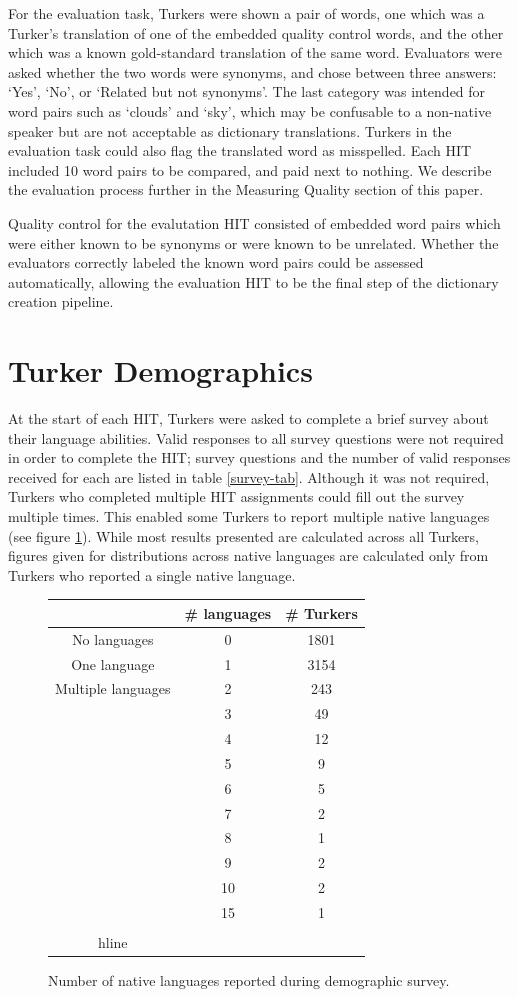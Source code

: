 \documentclass[11pt]{article}
\begin{document}
For the evaluation task, Turkers were shown a pair of words, one which was a Turker's translation of one of the embedded quality control words, and the other which was a known gold-standard translation of the same word. Evaluators were asked whether the two words were synonyms, and chose between three answers: `Yes', `No', or `Related but not synonyms'. The last category was intended for word pairs such as `clouds' and `sky', which may be confusable to a non-native speaker but are not acceptable as dictionary translations. Turkers in the evaluation task could also flag the translated word as misspelled. Each HIT included 10 word pairs to be compared, and paid next to nothing. We describe the evaluation process further in the Measuring Quality section of this paper.

Quality control for the evalutation HIT consisted of embedded word pairs which were either known to be synonyms or were known to be unrelated. Whether the evaluators correctly labeled the known word pairs could be assessed automatically, allowing the evaluation HIT to be the final step of the dictionary creation pipeline.


\section{Turker Demographics}
At the start of each HIT, Turkers were asked to complete a brief survey about their language abilities. Valid responses to all survey questions were not required in order to complete the HIT; survey questions and the number of valid responses received for each are listed in table \ref{survey-tab}. Although it was not required, Turkers who completed multiple HIT assignments could fill out the survey multiple times. This enabled some Turkers to report multiple native languages (see figure \ref{numlangs-tab}). While most results presented are calculated across all Turkers, figures given for distributions across native languages are calculated only from Turkers who reported a single native language.\\

\begin{figure}[h]
\begin{tabular}{ccc}\hline\hline
&\# languages&\# Turkers\\ \hline
No languages&0&1801\\
One language&1&3154\\
Multiple languages&2&243	\\
&3&49\\
&4&12\\
&5&9\\
&6&5\\
&7&2\\
&8&1\\
&9&2\\
&10&2\\
&15&1\\
\hline\\hline
\end{tabular}
\label{numlangs-tab}
\caption{Number of native languages reported during demographic survey.}
\end{figure}
\end{document}

